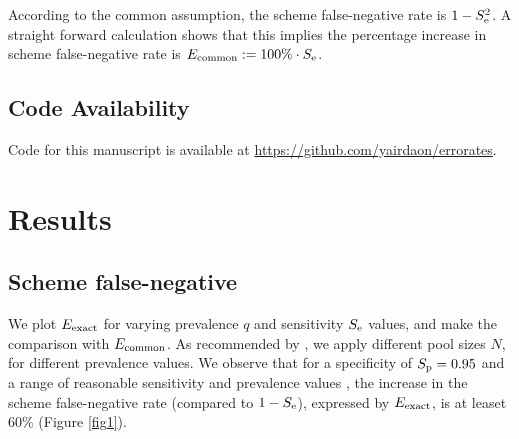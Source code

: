 \documentclass{article}
\begin{document}
According to the common assumption, the scheme false-negative rate is
$1-S_\text{e}^2$. A straight forward calculation shows that this implies the
percentage increase in scheme false-negative rate is $E_{\text{{common}}} :=
100\%\cdot S_\text{e}$.

\subsection*{Code Availability}
Code for this manuscript is available at
\url{https://github.com/yairdaon/errorates}.

\section*{Results}\label{section:results}
\subsection*{Scheme false-negative}
We plot $E_{\text{{exact}}}$ for varying prevalence $q$ and sensitivity $S_\text{e}$
values, and make the comparison with $E_{\text{{common}}}$. As recommended by
\cite{DorfmanYuvalDor}, we apply different pool sizes $N$, for
different prevalence values. We observe that for a specificity of
$S_\text{p}=0.95$ \cite{DorfmanYuvalDor} and a range of reasonable
sensitivity and prevalence values \cite{KitComparison,
  InterpretingCOVID19Test, EstimatingRatesLourenco,
  FalsePositiveEstimate}, the increase in the scheme false-negative rate
(compared to $1-S_\text{e}$), expressed by $E_{\text{{exact}}}$, is at leaset
$60\%$ (Figure \ref{fig1}).
\end{document}

